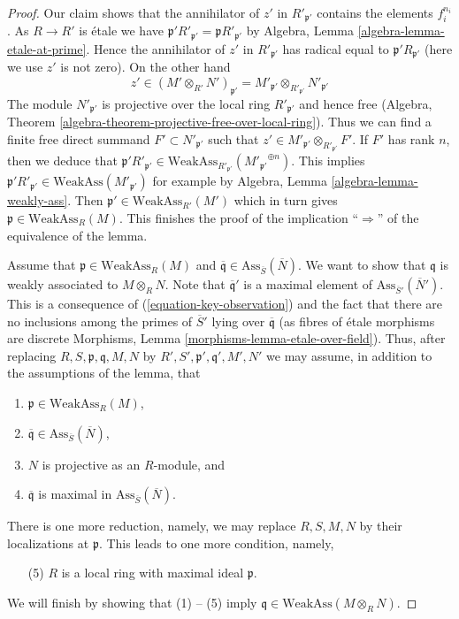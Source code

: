 \begin{proof}
\medskip\noindent
Our claim shows that the annihilator of $z'$ in $R'_{\mathfrak p'}$
contains the elements $f_i^{n_i}$. As $R \to R'$ is \'etale we have
$\mathfrak p'R'_{\mathfrak p'} = \mathfrak pR'_{\mathfrak p'}$
by Algebra, Lemma \ref{algebra-lemma-etale-at-prime}.
Hence the annihilator of $z'$ in $R'_{\mathfrak p'}$ has radical equal to
$\mathfrak p' R_{\mathfrak p'}$ (here we use $z'$ is not zero).
On the other hand
$$
z' \in (M' \otimes_{R'} N')_{\mathfrak p'} =
M'_{\mathfrak p'} \otimes_{R'_{\mathfrak p'}} N'_{\mathfrak p'}
$$
The module $N'_{\mathfrak p'}$ is projective over the local ring
$R'_{\mathfrak p'}$ and hence free
(Algebra, Theorem \ref{algebra-theorem-projective-free-over-local-ring}).
Thus we can find a finite free direct summand $F' \subset N'_{\mathfrak p'}$
such that $z' \in M'_{\mathfrak p'} \otimes_{R'_{\mathfrak p'}} F'$.
If $F'$ has rank $n$, then we deduce that
$\mathfrak p' R'_{\mathfrak p'} \in
\text{WeakAss}_{R'_{\mathfrak p'}}({M'_{\mathfrak p'}}^{\oplus n})$.
This implies
$\mathfrak p'R'_{\mathfrak p'} \in \text{WeakAss}(M'_{\mathfrak p'})$
for example by Algebra, Lemma \ref{algebra-lemma-weakly-ass}.
Then $\mathfrak p' \in \text{WeakAss}_{R'}(M')$
which in turn gives $\mathfrak p \in \text{WeakAss}_R(M)$.
This finishes the proof of the implication
``$\Rightarrow$'' of the equivalence of the lemma.

\medskip\noindent
Assume that $\mathfrak p \in \text{WeakAss}_R(M)$ and
$\overline{\mathfrak q} \in \text{Ass}_{\overline{S}}(\overline{N})$.
We want to show that $\mathfrak q$ is weakly associated to $M \otimes_R N$.
Note that $\overline{\mathfrak q}'$ is a maximal element of
$\text{Ass}_{\overline{S}'}(\overline{N}')$.
This is a consequence of (\ref{equation-key-observation})
and the fact that there are no inclusions among the primes
of $\overline{S}'$ lying over $\overline{\mathfrak q}$
(as fibres of \'etale morphisms are discrete
Morphisms, Lemma \ref{morphisms-lemma-etale-over-field}).
Thus, after replacing $R, S, \mathfrak p, \mathfrak q, M, N$ by
$R', S', \mathfrak p', \mathfrak q', M', N'$
we may assume, in addition to the assumptions of the lemma, that
\begin{enumerate}
\item $\mathfrak p \in \text{WeakAss}_R(M)$,
\item $\overline{\mathfrak q} \in \text{Ass}_{\overline{S}}(\overline{N})$,
\item $N$ is projective as an $R$-module, and
\item $\overline{\mathfrak q}$ is maximal in
$\text{Ass}_{\overline{S}}(\overline{N})$.
\end{enumerate}
There is one more reduction, namely, we may replace
$R, S, M, N$ by their localizations at $\mathfrak p$.
This leads to one more condition, namely,
\begin{enumerate}
\item[(5)] $R$ is a local ring with maximal ideal $\mathfrak p$.
\end{enumerate}
We will finish by showing that (1) -- (5) imply
$\mathfrak q \in \text{WeakAss}(M \otimes_R N)$.


\end{proof}
